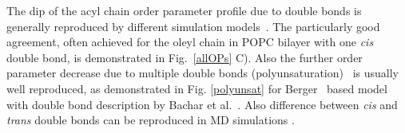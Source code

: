\documentclass[aps,prl,superscriptaddress,twocolumn]{revtex4}
\begin{document}
The dip of the acyl chain order parameter profile due to double bonds is generally reproduced by different simulation  models~\cite{hyvonen97,hyvonen97b,feller97,saiz01,huber02,feller02,bachar04,rog04,hyvonen05,ollila07a,dickson12,klauda10,klauda12,ferreira13,jambeck13,lee14,dickson14}. 
The particularly good agreement, often achieved for the oleyl chain in POPC bilayer with one {\it cis} double bond, is demonstrated in Fig.~\ref{allOPs} C).
Also the further order parameter decrease due to multiple double bonds (polyunsaturation)~\cite{hyvonen97,hyvonen97b,saiz01,huber02,feller02,bachar04,hyvonen05,ollila07a,klauda12} 
is usually well reproduced, as demonstrated in Fig. \ref{polyunsat} for Berger~\cite{berger97} based model with double bond description by Bachar et al.~\cite{bachar04}.
Also difference between {\it cis} and {\it trans} double bonds can be reproduced in MD simulations \cite{kulig15b}.
\end{document}
